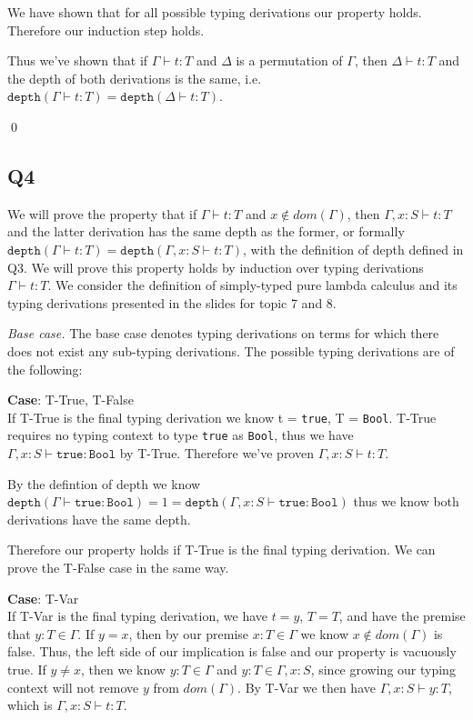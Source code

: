 \documentclass[12pt, fleqn]{article}
\begin{document}
We have shown that for all possible typing derivations our property holds. Therefore our induction step holds.

Thus we've shown that if $\Gamma \vdash t : T$ and $\Delta$ is a permutation of $\Gamma$, then $\Delta \vdash t : T$
and the depth of both derivations is the same, i.e. $\texttt{depth}(\Gamma \vdash t : T) = \texttt{depth}(\Delta \vdash t : T)$.

\qed

\subsection{Q4}

We will prove the property that if $\Gamma \vdash t : T$ and $x \notin dom(\Gamma)$, then $\Gamma, x: S \vdash t : T$ and the latter derivation
has the same depth as the former, or formally $\texttt{depth}(\Gamma \vdash t : T) = \texttt{depth}(\Gamma,x : S \vdash t : T)$, with the definition
of depth defined in Q3.
We will prove this property holds by induction over typing derivations $\Gamma \vdash t: T$. We consider the definition of simply-typed pure
lambda calculus and its typing derivations presented in the slides for topic 7 and 8.

\medskip
\emph{Base case.} The base case denotes typing derivations on terms for which there does not exist any sub-typing derivations.
The possible typing derivations are of the following:

\medskip
\textbf{Case}: T-True, T-False\\
If T-True is the final typing derivation we know t = \texttt{true}, T = \texttt{Bool}. T-True requires no typing
context to type \texttt{true} as \texttt{Bool}, thus we have $\Gamma, x: S \vdash \texttt{true}: \texttt{Bool}$ by T-True.
Therefore we've proven $\Gamma, x : S \vdash t : T$.

By the defintion of depth we know $\texttt{depth}(\Gamma \vdash \texttt{true} : \texttt{Bool}) = 1 = 
\texttt{depth}(\Gamma, x: S \vdash \texttt{true} : \texttt{Bool})$ thus we know both derivations have the same depth.


Therefore our property holds if T-True is the final typing derivation.
We can prove the T-False case in the same way.

\medskip
\textbf{Case}: T-Var\\
If T-Var is the final typing derivation, we have $t = y$, $T = T$, and have the premise that $y : T \in \Gamma$. 
If $y = x$, then by our premise $x : T \in \Gamma$ we know $x \notin dom(\Gamma)$ is false. Thus, the left side 
of our implication is false and our property is vacuously true. If $y \neq x$, then we know $y : T \in \Gamma$
and $y : T \in \Gamma, x : S$, since growing our typing context will not remove $y$ from $dom(\Gamma)$. By T-Var
we then have $\Gamma, x: S \vdash y : T$, which is $\Gamma, x : S \vdash t : T$.
\end{document}
